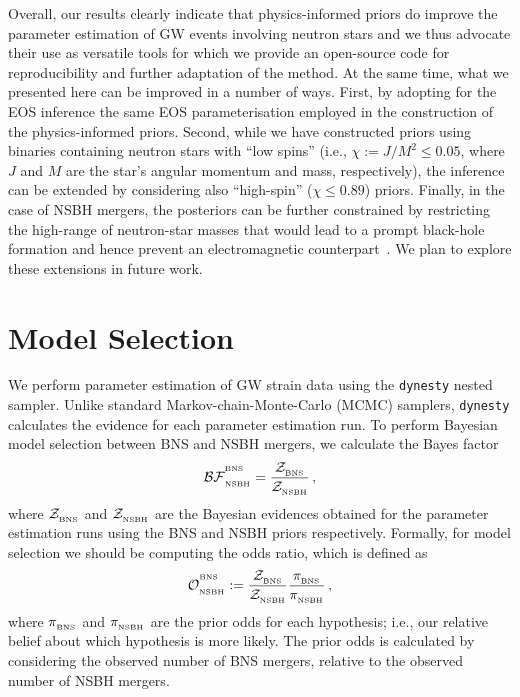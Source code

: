 \documentclass[twocolumn]{aastex631}
\begin{document}
Overall, our results clearly indicate that physics-informed priors do
improve the parameter estimation of GW events involving neutron stars and
we thus advocate their use as versatile tools for which we provide an
open-source code for reproducibility and further adaptation of the
method. At the same time, what we presented here can be improved in a
number of ways. First, by adopting for the EOS inference the same EOS
parameterisation employed in the construction of the physics-informed
priors. Second, while we have constructed priors using binaries
containing neutron stars with ``low spins'' (i.e., $\chi:=J/M^2 \leq
0.05$, where $J$ and $M$ are the star's angular momentum and mass,
respectively), the inference can be extended by considering also
``high-spin'' ($\chi \leq 0.89$) priors. Finally, in the case of NSBH
mergers, the posteriors can be further constrained by restricting the
high-range of neutron-star masses that would lead to a prompt black-hole
formation and hence prevent an electromagnetic
counterpart~\citep{Bauswein2013, Koeppel2019, Tootle2021,
  Kashyap:2021wzs, Koelsch2021, Ecker:2024kzs}.  We plan to explore these
extensions in future work.


\appendix
	
\section{Model Selection}
\label{sec:Model Selection}

We perform parameter estimation of GW strain data using the
\texttt{dynesty} nested sampler. Unlike standard Markov-chain-Monte-Carlo
(MCMC) samplers, \texttt{dynesty} calculates the evidence for each
parameter estimation run. To perform Bayesian model selection between BNS
and NSBH mergers, we calculate the Bayes factor
%
\begin{equation}
  \mathcal{BF}^{^{\rm BNS}}_{_{\rm NSBH}} = \frac{\mathcal{Z_{_{\rm
          BNS}}}}{\mathcal{Z_{_{\rm NSBH}}}}\,,
\end{equation}
%
where $\mathcal{Z}_{_{\rm BNS}}$ and $\mathcal{Z}_{_{\rm NSBH}}$ are the
Bayesian evidences obtained for the parameter estimation runs using the
BNS and NSBH priors respectively. Formally, for model selection we should
be computing the odds ratio, which is defined as
%
\begin{equation}
  \mathcal{O}^{^{\rm BNS}}_{_{\rm NSBH}} := \frac{\mathcal{Z_{_{\rm
          BNS}}}}{\mathcal{Z_{_{\rm NSBH}}}} \frac{\pi_{_{\rm
        BNS}}}{\pi_{_{\rm NSBH}}}\,,
\end{equation}
%
where $\pi_{_{\rm BNS}}$ and $\pi_{_{\rm NSBH}}$ are the prior odds for
each hypothesis; i.e., our relative belief about which hypothesis is more
likely. The prior odds is calculated by considering the observed number
of BNS mergers, relative to the observed number of NSBH mergers.
\end{document}
